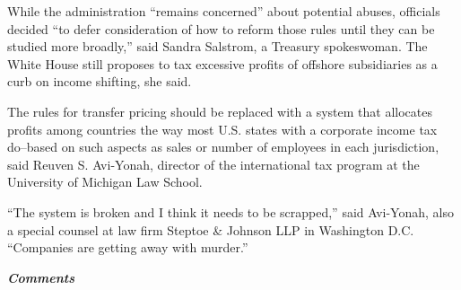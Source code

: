 \begin{select}
While the administration ``remains concerned'' about potential abuses, officials decided ``to defer consideration of how to reform those rules until they can be studied more broadly,'' said Sandra Salstrom, a Treasury spokeswoman. The White House still proposes to tax excessive profits of offshore subsidiaries as a curb on income shifting, she said.

The rules for transfer pricing should be replaced with a system that allocates profits among countries the way most U.S. states with a corporate income tax do--based on such aspects as sales or number of employees in each jurisdiction, said Reuven S. Avi-Yonah, director of the international tax program at the University of Michigan Law School.

``The system is broken and I think it needs to be scrapped,'' said Avi-Yonah, also a special counsel at law firm Steptoe \& Johnson LLP in Washington D.C. ``Companies are getting away with murder.''  

\end{select} 

	\begin{center}
			\emph{\textbf{Comments}}
	\end{center}


